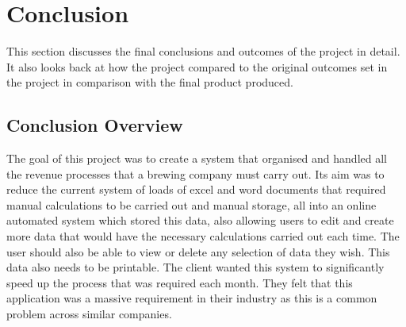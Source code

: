 \chapter{Conclusion}
This section discusses the final conclusions and outcomes of the project in detail. It also looks back at how the project compared to the original outcomes set in the project in comparison with the final product produced.

\section{Conclusion Overview}
The goal of this project was to create a system that organised and handled all the revenue processes that a brewing company must carry out. Its aim was to reduce the current system of loads of excel and word documents that required manual calculations to be carried out and manual storage, all into an online automated system which stored this data, also allowing users to edit and create more data that would have the necessary calculations carried out each time. The user should also be able to view or delete any selection of data they wish. This data also needs to be printable. The client wanted this system to significantly speed up the process that was required each month. They felt that this application was a massive requirement in their industry as this is a common problem across similar companies.

